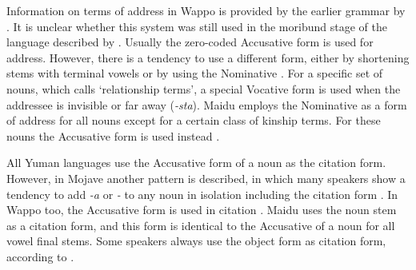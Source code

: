 Information on terms of address in Wappo is provided by the earlier grammar by \citet{Radin:1929}. 
It is unclear whether this system was still used in the moribund stage of the language described by \citet{Thompsonetal:2006}.
Usually the zero-coded Accusative form is used for address.  
However, there is a tendency to use a different form, either by shortening stems with terminal vowels or by using the Nominative  \citep[130]{Radin:1929}. 
For a specific set of nouns, which \citet[130,~133]{Radin:1929} calls `relationship terms', a special Vocative form is used when the addressee is invisible or far away (\emph{-sta}). 
Maidu employs the Nominative as a form of address for all nouns except for a certain class of kinship terms. For these nouns the Accusative form is used instead \citep[30]{Shipley:1964}.


All Yuman languages use the Accusative form of a noun as the citation form. 
However, in Mojave another pattern is described, in which many speakers show a tendency to add \emph{-a} or \emph{-\textschwa} to any noun in isolation including the citation form \citep[129, footnote 3]{Munro:1976}.
In Wappo too, the Accusative form is used in citation \citep{Lietal:1977}.
Maidu uses the noun stem as a citation form, and this form is identical to the Accusative of a noun for all vowel final stems. 
Some speakers always use the object form as citation form, according to \citet[30]{Shipley:1964}.

